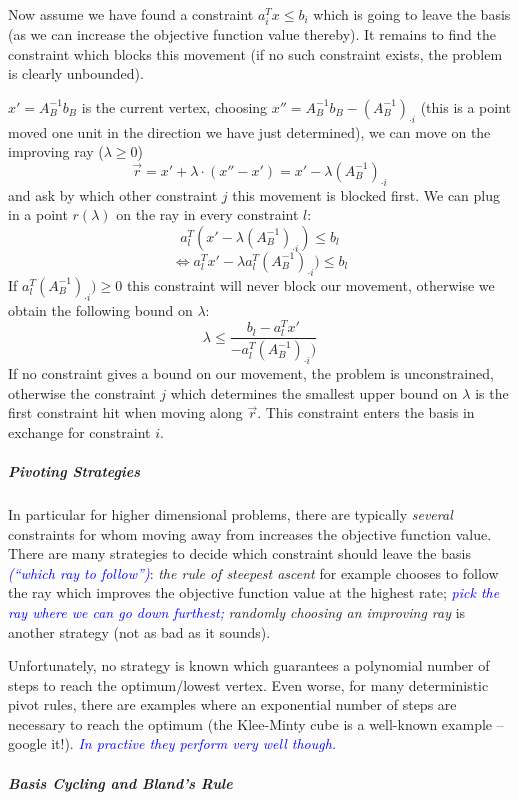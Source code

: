 \documentclass{article}
\begin{document}
Now assume we have found a constraint $a_i^T x \leq b_i$
which is going to leave the basis (as we can increase the objective function value thereby). 
It remains to find the constraint which
blocks this movement (if no such constraint exists, the problem is clearly unbounded).

$x'=A_B^{-1}b_B$ is the current vertex, choosing $x''=A_B^{-1}b_B - (A_B^{-1})_{\cdot i}$ (this is a point moved
one unit in the direction we have just determined), we can move 
on the improving ray  ($\lambda\geq 0$)
\[
	\overrightarrow{r}=x' + \lambda \cdot {(x''-x')}
			= x' - \lambda (A_B^{-1})_{\cdot i}
\]
and ask by which other constraint $j$ this movement is blocked first.
We can plug in a point $r(\lambda)$ on the ray in every constraint $l$:
\[
	a_l^{T}(x'-\lambda (A_B^{-1})_{\cdot i})\leq b_l
\]
\[
\Leftrightarrow	a_l^{T}x'-\lambda a_l^{T}(A_B^{-1})_{\cdot i})\leq b_l
\]
If $a_l^{T}(A_B^{-1})_{\cdot i})\geq0$ this constraint will never block our movement, otherwise
we obtain the following bound on $\lambda$:
\[
	\lambda \leq \frac{b_l - a_l^{T}x'}{-a_l^{T}(A_B^{-1})_{\cdot i})}
\]
If no constraint gives a bound on our movement, the problem is unconstrained, otherwise the constraint $j$
which determines the smallest upper bound on $\lambda$ is the first constraint hit when moving along
$\overrightarrow{r}$. This constraint enters the basis in exchange for constraint $i$.

\subparagraph*{Pivoting Strategies}
In particular for higher dimensional problems, there are typically \emph{several} constraints for whom moving away from increases the objective function value. There are many strategies to decide which constraint should leave the basis \textcolor{blue}{\emph{(``which ray to follow'')}}: \emph{the rule of steepest ascent} for example chooses to follow the ray which improves the objective function value at the highest rate; \textcolor{blue}{\emph{pick the ray where we can go down furthest;}} \emph{randomly choosing an improving ray} is another strategy (not as bad as it sounds).

Unfortunately, no strategy is known which guarantees a polynomial number of steps to reach the optimum/lowest vertex. Even worse, for many deterministic pivot rules, there are examples where an exponential number of steps are necessary to reach the optimum (the Klee-Minty cube is a well-known example -- google it!). \textcolor{blue}{\emph{In practive they perform very well though.}}


\subparagraph*{Basis Cycling and Bland's Rule}
\end{document}
